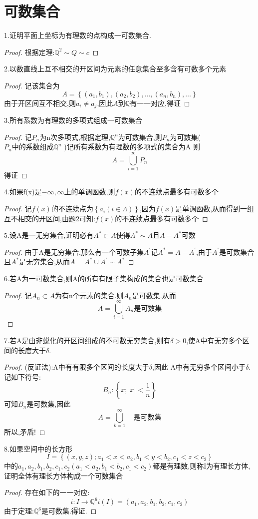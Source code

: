 \section{可数集合}
1.证明平面上坐标为有理数的点构成一可数集合.
\begin{proof}
    根据定理:\(\mathbb{Q}^2 \sim Q \sim c\)
\end{proof}
2.以数直线上互不相交的开区间为元素的任意集合至多含有可数多个元素
\begin{proof}
    记该集合为\[A=\left\{(a_1,b_1),(a_2,b_2),\dots,(a_n,b_n),\dots \right\}\]
    由于开区间互不相交,则\(a_i \neq a_j\),因此\(A\)到\(\mathbb{Q}\)有一一对应,得证
\end{proof}
3.所有系数为有理数的多项式组成一可数集合
\begin{proof}
    记\(P_n\)为n次多项式,根据定理,\(\mathbb{Q}^n\)为可数集合,则\(P_n\)为可数集(\(P_n \text{中的系数组成}\mathbb{Q}^n\) )记所有系数为有理数的多项式的集合为A
    则\[A=\bigcup\limits_{i=1}^{\infty}P_n \]得证
\end{proof}
4.如果f(x)是\(-\infty , \infty \)上的单调函数,则\(f(x)\)的不连续点最多有可数多个
\begin{proof}
    记\(f(x)\)的不连续点为\(\left\{a_i (i \in \Lambda)\right\}\),因为\(f(x)\)是单调函数,从而得到一组互不相交的开区间,由题2可知:\(f(x)\)的不连续点最多有可数多个
\end{proof}
5.设A是一无穷集合,证明必有\(A^{*} \subset A\)使得\(A^{*} \sim A\)且\(A -A^{*}\)可数
\begin{proof}
    由于A是无穷集合,那么有一个可数子集\(A^{'}\)记\(A^{*}=A - A^{'}\),由于\(A^{'}\)是可数集合且\(A^{*}\)是无穷集合,从而\(A=A^{*}\cup A^{'} \sim A^{*}\)
\end{proof}
6.若A为一可数集合,则A的所有有限子集构成的集合也是可数集合
\begin{proof}
    记\(A_n \subset A\)为有n个元素的集合.则\(A_n\)是可数集.从而\[A=\bigcup\limits_{i=1}^{\infty}A_n \text{是可数集}\]
\end{proof}
7.若A是由非蜕化的开区间组成的不可数无穷集合,则有\(\delta >0\),使A中有无穷多个区间的长度大于\(\delta\).
\begin{proof}
    (反证法):A中有有限多个区间的长度大于\(\delta\),因此 A中有无穷多个区间小于\(\delta\). 记如下符号:
    \[B_n :  \left\{x ; |x| < \frac{1}{n} \right\}\]
    可知\(B_n\)是可数集,因此\[A = \bigcup\limits_{k=1}^{\infty} \quad \text{是可数集}\]
    所以,矛盾!
\end{proof}
8.如果空间中的长方形\[I = \left\{(x,y,z) ; a_1 < x<a_2 , b_1<y < b_2,c_1<z<c_2\right\}\]
中的\(a_1,a_2,b_1,b_2,c_1,c_2(a_1< a_2 , b_1 <b_2 ,c_1 <c_2)\)都是有理数,则称I为有理长方体,证明全体有理长方体构成一个可数集合
\begin{proof}
    存在如下的一一对应:\[i: I \rightarrow \mathbb{Q}^6 i(I)=(a_1,a_2,b_1,b_2,c_1,c_2)\]
    由于定理:\(\mathbb{Q}^6\)是可数集.得证.
\end{proof}
